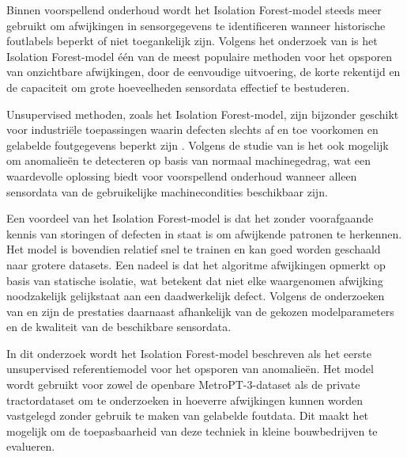 {{{{{Binnen voorspellend onderhoud wordt het Isolation Forest-model steeds meer gebruikt om afwijkingen in sensorgegevens te identificeren wanneer historische foutlabels beperkt of niet toegankelijk zijn. Volgens het onderzoek van \textcite{Carvalho2019} is het Isolation Forest-model één van de meest populaire methoden voor het opsporen van onzichtbare afwijkingen, door de eenvoudige uitvoering, de korte rekentijd en de capaciteit om grote hoeveelheden sensordata effectief te bestuderen.

Unsupervised methoden, zoals het Isolation Forest-model, zijn bijzonder geschikt voor industriële toepassingen waarin defecten slechts af en toe voorkomen en gelabelde foutgegevens beperkt zijn \autocite{Elahi2023}. Volgens de studie van \textcite{Giannoulidis2024} is het ook mogelijk om anomalieën te detecteren op basis van normaal machinegedrag, wat een waardevolle oplossing biedt voor voorspellend onderhoud wanneer alleen sensordata van de gebruikelijke machinecondities beschikbaar zijn.

Een voordeel van het Isolation Forest-model is dat het zonder voorafgaande kennis van storingen of defecten in staat is om afwijkende patronen te herkennen. Het model is bovendien relatief snel te trainen en kan goed worden geschaald naar grotere datasets. Een nadeel is dat het algoritme afwijkingen opmerkt op basis van statische isolatie, wat betekent dat niet elke waargenomen afwijking noodzakelijk gelijkstaat aan een daadwerkelijk defect. Volgens de onderzoeken van \textcite{Carvalho2019} en \textcite{Elahi2023} zijn de prestaties daarnaast afhankelijk van de gekozen modelparameters en de kwaliteit van de beschikbare sensordata.

In dit onderzoek wordt het Isolation Forest-model beschreven als het eerste unsupervised referentiemodel voor het opsporen van anomalieën. Het model wordt gebruikt voor zowel de openbare MetroPT-3-dataset als de private tractordataset om te onderzoeken in hoeverre afwijkingen kunnen worden vastgelegd zonder gebruik te maken van gelabelde foutdata. Dit maakt het mogelijk om de toepasbaarheid van deze techniek in kleine bouwbedrijven te evalueren.


}}}}}
